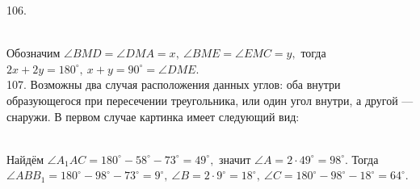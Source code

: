 \documentclass[12pt]{article}
\begin{document}
106. \begin{figure}[ht!]
\end{figure}\\
Обозначим $\angle BMD=\angle DMA=x,\ \angle BME=\angle EMC=y,$ тогда $2x+2y=180^\circ,\ x+y=90^\circ=\angle DME.$\\
107. Возможны два случая расположения данных углов: оба внутри образующегося при пересечении треугольника, или один угол внутри, а другой --- снаружи. В первом случае картинка имеет следующий вид:
\begin{figure}[ht!]
\end{figure}\\
Найдём $\angle A_1AC=180^\circ-58^\circ-73^\circ=49^\circ,$ значит $\angle A=2\cdot49^\circ=98^\circ.$ Тогда $\angle ABB_1=180^\circ-98^\circ-73^\circ=9^\circ,\ \angle B=2\cdot9^\circ=18^\circ,\ \angle C=180^\circ-98^\circ-18^\circ=64^\circ.$\\
\end{document}
